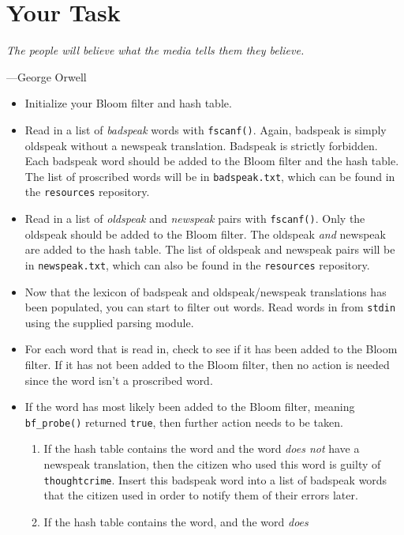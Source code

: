 \documentclass{article}
\begin{document}
\section{Your Task}

\textwidth
\epigraph{\emph{The people will believe what the media tells them they
believe.}}{---George Orwell}

\begin{itemize}
  \item Initialize your Bloom filter and hash table.
  \item Read in a list of \emph{badspeak} words with \texttt{fscanf()}.
    Again, badspeak is simply oldspeak without a newspeak translation.
    Badspeak is strictly forbidden. Each badspeak word should be added
    to the Bloom filter and the hash table. The list of proscribed words
    will be in \texttt{badspeak.txt}, which can be found in the
    \texttt{resources} repository.
  \item Read in a list of \emph{oldspeak} and \emph{newspeak} pairs with
    \texttt{fscanf()}. Only the oldspeak should be added to the Bloom
    filter. The oldspeak \emph{and} newspeak are added to the hash
    table. The list of oldspeak and newspeak pairs will be in
    \texttt{newspeak.txt}, which can also be found in the
    \texttt{resources} repository.
  \item Now that the lexicon of badspeak and oldspeak/newspeak
    translations has been populated, you can start to filter out words.
    Read words in from \texttt{stdin} using the supplied parsing module.
  \item For each word that is read in, check to see if it has been added
    to the Bloom filter. If it has not been added to the Bloom filter,
    then no action is needed since the word isn't a proscribed word.
  \item If the word has most likely been added to the Bloom filter,
    meaning \texttt{bf\_probe()} returned \texttt{true}, then further
    action needs to be taken.
    \begin{enumerate}
      \item If the hash table contains the word and the word \emph{does
        not} have a newspeak translation, then the citizen who used this
        word is guilty of \texttt{thoughtcrime}. Insert this badspeak
        word into a list of badspeak words that the citizen used in
        order to notify them of their errors later.
      \item If the hash table contains the word, and the word \emph{does}

\end{enumerate}
\end{itemize}
\end{document}
